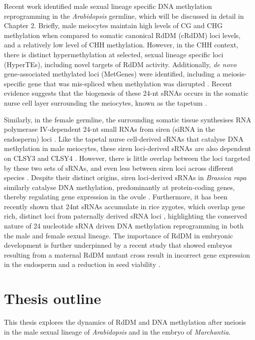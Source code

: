 Recent work identified male sexual lineage specific DNA methylation reprogramming in the \textit{Arabidopsis} germline, which will be discussed in detail in Chapter 2. Briefly, male meiocytes maintain high levels of CG and CHG methylation when compared to somatic canonical RdDM (cRdDM) loci levels, and a relatively low level of CHH methylation. However, in the CHH context, there is distinct hypermethylation at selected, sexual lineage specific loci (HyperTEs), including novel targets of RdDM activity. Additionally, \textit{de novo} gene-associated methylated loci (MetGenes) were identified, including a meiosis-specific gene that was mis-spliced when methylation was disrupted \cite{RN199}. Recent evidence suggests that the biogenesis of these 24-nt sRNAs occurs in the somatic nurse cell layer surrounding the meiocytes, known as the tapetum \cite{RN187}. 

Similarly, in the female germline, the surrounding somatic tissue synthesises RNA polymerase IV-dependent 24-nt small RNAs from siren (siRNA in the endosperm) loci \cite{RN164,RN163,RN162}. Like the tapetal nurse cell-derived sRNAs that catalyse DNA methylation in male meiocytes, these siren loci-derived sRNAs are also dependent on CLSY3 and CLSY4 \cite{RN162}. However, there is little overlap between the loci targeted by these two sets of sRNAs, and even less between siren loci across different species \cite{RN163}. Despite their distinct origins, siren loci-derived sRNAs in \textit{Brassica rapa} similarly catalyse DNA methylation, predominantly at protein-coding genes, thereby regulating gene expression in the ovule \cite{RN165}. Furthermore, it has been recently shown that 24nt sRNAs accumulate in rice zygotes, which overlap gene rich, distinct loci from paternally derived sRNA loci \cite{RN166}, highlighting the conserved nature of 24 nucleotide sRNA driven DNA methylation reprogramming in both the male and female sexual lineage. The importance of RdDM in embryonic development is further underpinned by a recent study that showed embryos resulting from a maternal RdDM mutant cross result in incorrect gene expression in the endosperm and a reduction in seed viability \cite{RN167}.

\section{Thesis outline}

This thesis explores the dynamics of RdDM and DNA methylation after meiosis in the male sexual lineage of \textit{Arabidopsis} and in the embryo of \textit{Marchantia}.

